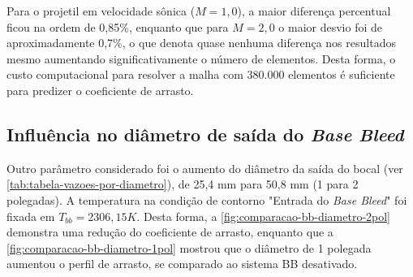 Para o projetil em velocidade sônica ($M = 1,0$), a maior diferença percentual ficou na ordem de 0,85$\%$, enquanto que para $M = 2,0$ o maior desvio foi de aproximadamente 0,7$\%$, o que denota quase nenhuma diferença nos resultados mesmo aumentando significativamente o número de elementos. Desta forma, o custo computacional para resolver a malha com 380.000 elementos é suficiente para predizer o coeficiente de arrasto.

\subsection{Influência no diâmetro de saída do \textit{Base Bleed}} \label{subsec:resultados-com-basebleed-diametros}

Outro parâmetro considerado foi o aumento do diâmetro da saída do bocal (ver \autoref{tab:tabela-vazoes-por-diametro}), de 25,4 mm para 50,8 mm (1 para 2 polegadas). A temperatura na condição de contorno "Entrada do \textit{Base Bleed}"{} foi fixada em $T_{bb} = 2306,15 K$. Desta forma, a \autoref{fig:comparacao-bb-diametro-2pol} demonstra uma redução do coeficiente de arrasto, enquanto que a \autoref{fig:comparacao-bb-diametro-1pol} mostrou que o diâmetro de 1 polegada aumentou o perfil de arrasto, se comparado ao sistema BB desativado.


